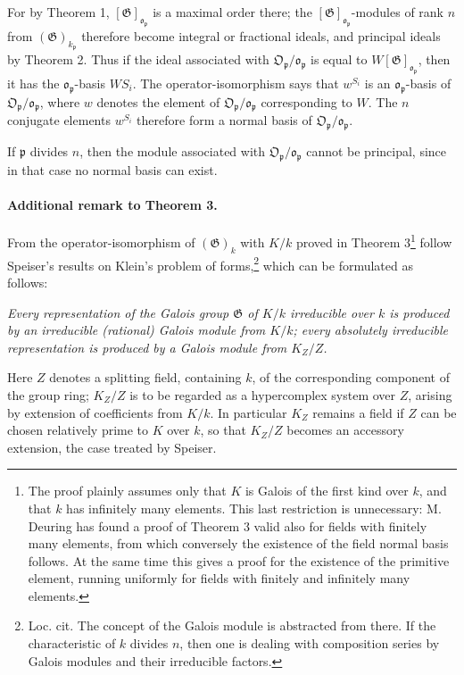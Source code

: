 \documentclass[11pt]{article}
\providecommand{\frakO}{\mathfrak O}
\providecommand{\frako}{\mathfrak o}
\providecommand{\frakp}{\mathfrak p}
\providecommand{\Gg}{\mathfrak G}
\begin{document}
For by Theorem 1, \([\Gg]_{\frako_\frakp}\) is a maximal order there; the \([\Gg]_{\frako_\frakp}\)-modules of rank \(n\) from \((\Gg)_{k_\frakp}\) therefore become integral or fractional ideals, and principal ideals by Theorem 2. Thus if the ideal associated with \(\frakO_\frakp/\frako_\frakp\) is equal to \(W[\Gg]_{\frako_\frakp}\), then it has the \(\frako_\frakp\)-basis \(WS_i\). The operator-isomorphism says that \(w^{S_i}\) is an \(\frako_\frakp\)-basis of \(\frakO_\frakp/\frako_\frakp\), where \(w\) denotes the element of \(\frakO_\frakp/\frako_\frakp\) corresponding to \(W\). The \(n\) conjugate elements \(w^{S_i}\) therefore form a normal basis of \(\frakO_\frakp/\frako_\frakp\).

If \(\frakp\) divides \(n\), then the module associated with \(\frakO_\frakp/\frako_\frakp\) cannot be principal, since in that case no normal basis can exist.

\paragraph{Additional remark to Theorem 3.}
From the operator-isomorphism of \((\Gg)_k\) with \(K/k\) proved in Theorem 3\footnote{The proof plainly assumes only that \(K\) is Galois of the first kind over \(k\), and that \(k\) has infinitely many elements. This last restriction is unnecessary: M. Deuring has found a proof of Theorem 3 valid also for fields with finitely many elements, from which conversely the existence of the field normal basis follows. At the same time this gives a proof for the existence of the primitive element, running uniformly for fields with finitely and infinitely many elements.} follow Speiser's results on Klein's problem of forms,\footnote{Loc. cit. The concept of the Galois module is abstracted from there. If the characteristic of \(k\) divides \(n\), then one is dealing with composition series by Galois modules and their irreducible factors.} which can be formulated as follows:

\emph{Every representation of the Galois group \(\Gg\) of \(K/k\) irreducible over \(k\) is produced by an irreducible (rational) Galois module from \(K/k\); every absolutely irreducible representation is produced by a Galois module from \(K_Z/Z\).}

Here \(Z\) denotes a splitting field, containing \(k\), of the corresponding component of the group ring; \(K_Z/Z\) is to be regarded as a hypercomplex system over \(Z\), arising by extension of coefficients from \(K/k\). In particular \(K_Z\) remains a field if \(Z\) can be chosen relatively prime to \(K\) over \(k\), so that \(K_Z/Z\) becomes an accessory extension, the case treated by Speiser.
\end{document}
